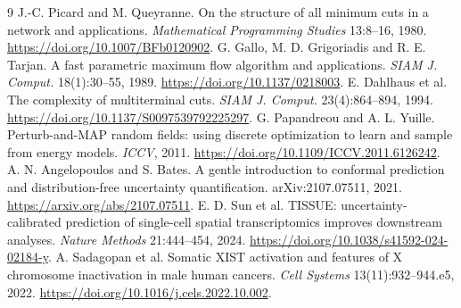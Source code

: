 \documentclass[11pt,letterpaper]{article}
\begin{document}
\clearpage
\begin{thebibliography}{9}
 J.-C. Picard and M. Queyranne. On the structure of all minimum cuts in a network and applications. \emph{Mathematical Programming Studies} 13:8--16, 1980. \url{https://doi.org/10.1007/BFb0120902}.
 G. Gallo, M. D. Grigoriadis and R. E. Tarjan. A fast parametric maximum flow algorithm and applications. \emph{SIAM J. Comput.} 18(1):30--55, 1989. \url{https://doi.org/10.1137/0218003}.
 E. Dahlhaus et al. The complexity of multiterminal cuts. \emph{SIAM J. Comput.} 23(4):864--894, 1994. \url{https://doi.org/10.1137/S0097539792225297}.
 G. Papandreou and A. L. Yuille. Perturb-and-MAP random fields: using discrete optimization to learn and sample from energy models. \emph{ICCV}, 2011. \url{https://doi.org/10.1109/ICCV.2011.6126242}.
 A. N. Angelopoulos and S. Bates. A gentle introduction to conformal prediction and distribution-free uncertainty quantification. arXiv:2107.07511, 2021. \url{https://arxiv.org/abs/2107.07511}.
 E. D. Sun et al. TISSUE: uncertainty-calibrated prediction of single-cell spatial transcriptomics improves downstream analyses. \emph{Nature Methods} 21:444--454, 2024. \url{https://doi.org/10.1038/s41592-024-02184-y}.
 A. Sadagopan et al. Somatic XIST activation and features of X chromosome inactivation in male human cancers. \emph{Cell Systems} 13(11):932--944.e5, 2022. \url{https://doi.org/10.1016/j.cels.2022.10.002}.
\end{thebibliography}
\end{document}

